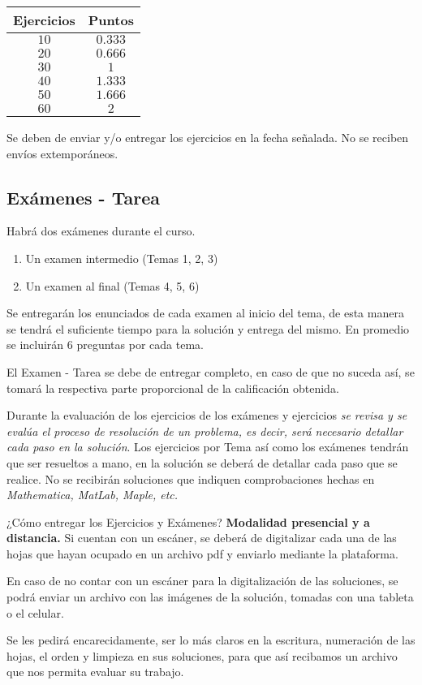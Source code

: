 \begin{table}[H]
\centering
\renewcommand{\arraystretch}{1.1}
\begin{tabular}{c | c}
Ejercicios & Puntos \\ \hline
$10$ & $0.333$  \\ \hline
$20$ & $0.666$ \\ \hline
$30$ & $1$ \\ \hline
$40$ & $1.333$ \\ \hline
$50$ & $1.666$ \\ \hline
$60$ & $2$ \\ \hline
\end{tabular}
\end{table}

Se deben de enviar y/o entregar los ejercicios en la fecha señalada. No se reciben envíos extemporáneos.

\subsection{Exámenes - Tarea}

Habrá dos exámenes durante el curso.

\begin{enumerate}
\item Un examen intermedio (Temas 1, 2, 3)
\item Un examen al final (Temas 4, 5, 6)
\end{enumerate}

Se entregarán los enunciados de cada examen al inicio del tema, de esta manera se tendrá el suficiente tiempo para la solución y entrega del mismo. En promedio se incluirán 6 preguntas por cada tema.
\par
El Examen - Tarea se debe de entregar completo, en caso de que no suceda así, se tomará la respectiva parte proporcional de la calificación obtenida.
\par
Durante la evaluación de los ejercicios de los exámenes y ejercicios  \emph{se revisa y se evalúa el proceso de resolución de un problema, es decir, será necesario detallar cada paso en la solución}. Los ejercicios por Tema así como los exámenes tendrán que ser resueltos a mano, en la solución se deberá de detallar cada paso que se realice. No se recibirán soluciones que indiquen comprobaciones hechas en \emph{Mathematica, MatLab, Maple, etc.}
\par 
¿Cómo entregar los Ejercicios y Exámenes? \textbf{Modalidad presencial y a distancia. } Si cuentan con un escáner, se deberá de digitalizar cada una de las hojas que hayan ocupado en un archivo pdf y enviarlo mediante la plataforma.
\par
En caso de no contar con un escáner para la digitalización de las soluciones, se podrá enviar un archivo con las imágenes de la solución, tomadas con una tableta o el celular.
\par
Se les pedirá encarecidamente, ser lo más claros en la escritura, numeración de las hojas, el orden y limpieza en sus soluciones, para que así recibamos un archivo que nos permita evaluar su trabajo.

